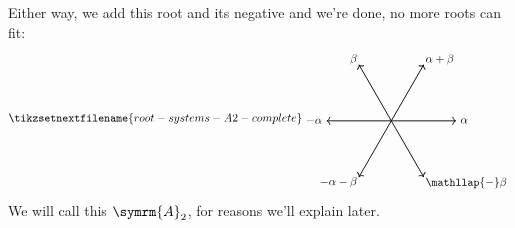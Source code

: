 \documentclass[fleqn]{NotesClass}
\newcommand{\dynkin}[2]{\symrm{#1}_{#2}}
\begin{document}
    Either way, we add this root and its negative and we're done, no more roots can fit:
    \begin{equation}
        \tikzsetnextfilename{root-systems-A2-complete}
        \begin{tikzpicture}[baseline=(current bounding box)]
            \draw[->, thick] (0, 0) -- (2, 0) node [right] {\(\alpha\)};
            \draw[->, thick] (0, 0) -- (120:2) node [above left, shift={(-60:0.15)}] {\(\beta\)};
            \draw[->, thick] (0, 0) -- (-2, 0) node [left] {\(-\alpha\)};
            \draw[->, thick] (0, 0) -- (-60:2) node [below right, shift={(120:0.15)}] {\(\mathllap{-}\beta\)};
            \draw[->, thick] (0, 0) -- (60:2) node [above right, shift={(-120:0.15)}] {\(\alpha + \beta\)};
            \draw[->, thick] (0, 0) -- (-120:2) node [below left, shift={(60:0.15)}] {\(-\alpha - \beta\)};
        \end{tikzpicture}
    \end{equation}
    We will call this \(\dynkin{A}{2}\), for reasons we'll explain later.
    
\end{document}
